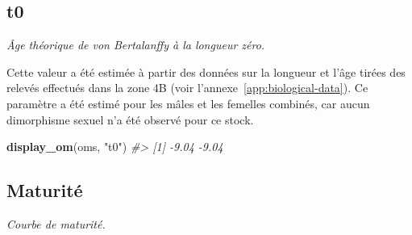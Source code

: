 \documentclass[11pt]{book}
\newenvironment{Shaded}{\begin{snugshade}}{\end{snugshade}}
\newcommand{\CommentTok}[1]{\textcolor[rgb]{0.56,0.35,0.01}{\textit{#1}}}
\newcommand{\KeywordTok}[1]{\textcolor[rgb]{0.13,0.29,0.53}{\textbf{#1}}}
\newcommand{\NormalTok}[1]{#1}
\newcommand{\StringTok}[1]{\textcolor[rgb]{0.31,0.60,0.02}{#1}}
\begin{document}
\subsection{t0}

\emph{Âge théorique de von Bertalanffy à la longueur zéro.}

Cette valeur a été estimée à partir des données sur la longueur et l'âge tirées des relevés effectués dans la zone 4B (voir l'annexe~\ref{app:biological-data}). Ce paramètre a été estimé pour les mâles et les femelles combinés, car aucun dimorphisme sexuel n'a été observé pour ce stock.
\begin{Shaded}
\begin{Highlighting}[]
\KeywordTok{display_om}\NormalTok{(oms, }\StringTok{"t0"}\NormalTok{)}
\CommentTok{#> [1] -9.04 -9.04}
\end{Highlighting}
\end{Shaded}
\label{app:desc-stock-maturity-yelloweye}
\subsection{Maturité}

\emph{Courbe de maturité.}
\end{document}
